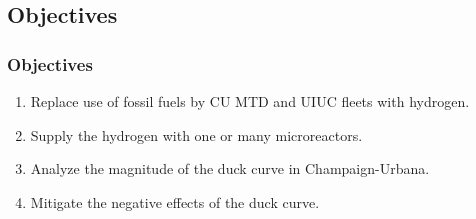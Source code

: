 \subsection{Objectives}
\begin{frame}
\frametitle{Objectives}
\centering
    \begin{enumerate}
    	\item Replace use of fossil fuels by CU MTD and UIUC fleets with hydrogen.
    	\item Supply the hydrogen with one or many microreactors.
    	\item Analyze the magnitude of the duck curve in Champaign-Urbana.
        \item Mitigate the negative effects of the duck curve.
	\end{enumerate}
\end{frame}